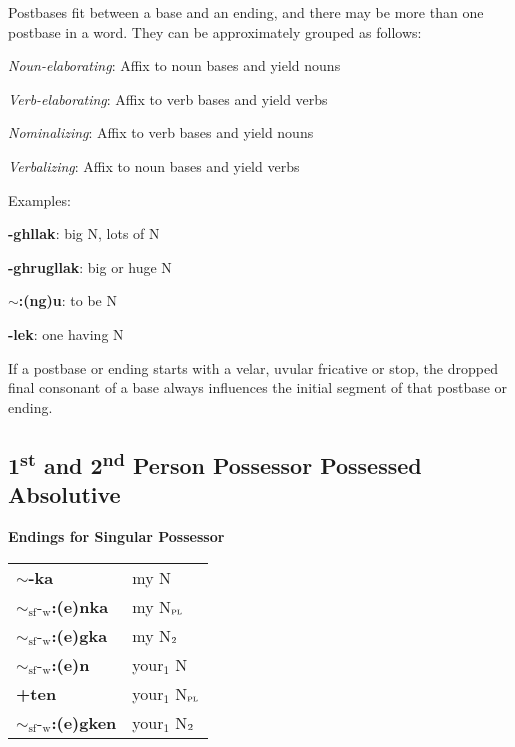 \documentclass{article}
\begin{document}
Postbases fit between a base and an ending, and there may be more than one postbase in a word.
%
They can be approximately grouped as follows:

\begin{description}
\item \textit{Noun-elaborating}: Affix to noun bases and yield nouns
\item \textit{Verb-elaborating}: Affix to verb bases and yield verbs
\item \textit{Nominalizing}: Affix to verb bases and yield nouns
\item \textit{Verbalizing}: Affix to noun bases and yield verbs
\end{description}

Examples:

\begin{description}
\item \textbf{-ghllak}: big N, lots of N
\item \textbf{-ghrugllak}: big or huge N
\item \textbf{$\sim$:(ng)u}: to be N
\item \textbf{-lek}: one having N
\end{description}

If a postbase or ending starts with a velar, uvular fricative or stop, the dropped final consonant of a base always influences the initial segment of that postbase or ending.

\subsection{1\textsuperscript{st} and 2\textsuperscript{nd} Person Possessor Possessed Absolutive}

\textbf{Endings for Singular Possessor}

\begin{tabular}{ l l }
\textbf{$\sim$-ka} & my N \\ 
\textbf{${\sim}_\text{sf}\text{-}_\text{w}$:(e)nka} & my N$_\text{\textsc{pl}}$ \\  
\textbf{${\sim}_\text{sf}\text{-}_\text{w}$:(e)gka} & my N$_\text{\textsc{2}}$ \\  
\textbf{${\sim}_\text{sf}\text{-}_\text{w}$:(e)n} & your$_1$ N \\  
\textbf{+ten} & your$_1$ N$_\text{\textsc{pl}}$ \\
\textbf{${\sim}_\text{sf}\text{-}_\text{w}$:(e)gken} & your$_1$ N$_\text{\textsc{2}}$ \\  
\end{tabular}
\end{document}
